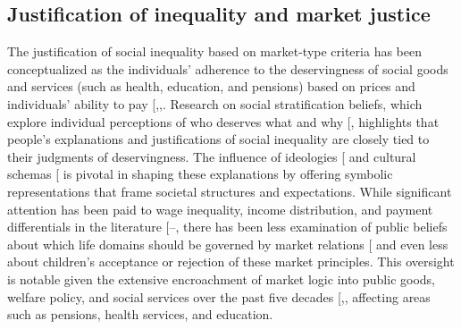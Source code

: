 \documentclass[
  12pt,
  letterpaper,
]{article}
\begin{document}
\subsection{Justification of inequality and market
justice}\label{justification-of-inequality-and-market-justice}

The justification of social inequality based on market-type criteria has
been conceptualized as the individuals' adherence to the deservingness
of social goods and services (such as health, education, and pensions)
based on prices and individuals' ability to pay
{[},,\citeproc{ref-streeck_citizens_2012}{23}{]}.
Research on social stratification beliefs, which explore individual
perceptions of who deserves what and why
{[}\citeproc{ref-kluegel_beliefs_1987}{24}{]}, highlights that people's
explanations and justifications of social inequality are closely tied to
their judgments of deservingness. The influence of ideologies
{[}\citeproc{ref-wegener_dominant_1995}{25}{]} and cultural schemas
{[}\citeproc{ref-homan_being_2017}{26}{]} is pivotal in shaping these
explanations by offering symbolic representations that frame societal
structures and expectations. While significant attention has been paid
to wage inequality, income distribution, and payment differentials in
the literature
{[}--\citeproc{ref-shariff_income_2016}{30}{]},
there has been less examination of public beliefs about which life
domains should be governed by market relations
{[}\citeproc{ref-lindh_bringing_2023}{10}{]} and even less about
children's acceptance or rejection of these market principles. This
oversight is notable given the extensive encroachment of market logic
into public goods, welfare policy, and social services over the past
five decades
{[},\citeproc{ref-harvey_breve_2015}{32}{]},
affecting areas such as pensions, health services, and education.
\end{document}
